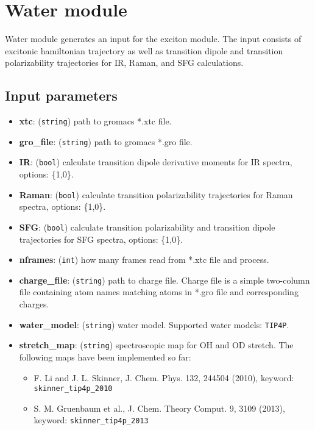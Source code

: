 \documentclass{article}
\begin{document}
\section{Water module}
Water module generates an input for the exciton module. The input consists of excitonic hamiltonian trajectory as well as 
transition dipole and transition polarizability trajectories for IR, Raman, and SFG calculations.

\subsection{Input parameters}

\begin{itemize}

\item \textbf{xtc}: (\texttt{string}) path to gromacs *.xtc file.
\item \textbf{gro\_file}: (\texttt{string}) path to gromacs *.gro file.
\item \textbf{IR}: (\texttt{bool}) calculate transition dipole derivative moments for IR spectra, options: \{1,0\}.
\item \textbf{Raman}: (\texttt{bool}) calculate transition polarizability trajectories for Raman spectra, options: \{1,0\}.
\item \textbf{SFG}: (\texttt{bool}) calculate transition polarizability and transition dipole trajectories for SFG spectra, options: \{1,0\}.
\item \textbf{nframes}: (\texttt{int}) how many frames read from *.xtc file and process.
\item \textbf{charge\_file}: (\texttt{string}) path to charge file. Charge file is a simple two-column file containing atom names matching atoms in 
*.gro file and corresponding charges.
\item \textbf{water\_model}: (\texttt{string}) water model. Supported water models: \texttt{TIP4P}.
\item \textbf{stretch\_map}: (\texttt{string}) spectroscopic map for OH and OD stretch. The following maps have been implemented so far:
\begin{itemize}
\item F. Li and J. L. Skinner, J. Chem. Phys. 132, 244504 (2010), keyword: \texttt{skinner\_tip4p\_2010}
\item S. M. Gruenbaum et al., J. Chem. Theory Comput. 9, 3109 (2013), keyword: \texttt{skinner\_tip4p\_2013}
\end{itemize}


\end{itemize}
\end{document}
